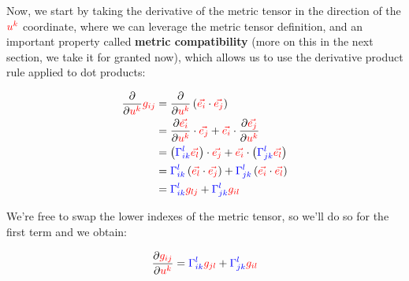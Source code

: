 Now, we start by taking the derivative of the metric tensor in the direction of the $\color{red}u^k$ coordinate, where we can leverage the metric tensor
definition, and an important property called \textbf{metric compatibility} (more on this in the next section, we take it for granted now), which allows us to use 
the derivative product rule applied to dot products:

\begin{align*}
    \frac{\partial}{\partial \begingroup\color{red}u^k\endgroup} \begingroup\color{red}g_{ij}\endgroup &= \frac{\partial}{\partial \begingroup\color{red}u^k\endgroup} \left(\begingroup\color{red}\vec{e_i}\endgroup \cdot \begingroup\color{red}\vec{e_j}\endgroup\right)\\
    &= \frac{\partial \begingroup\color{red}\vec{e_i}\endgroup}{\partial \begingroup\color{red}u^k\endgroup} \cdot \begingroup\color{red}\vec{e_j}\endgroup + \begingroup\color{red}\vec{e_i}\endgroup \cdot \frac{\partial \begingroup\color{red}\vec{e_j}\endgroup}{\partial \begingroup\color{red}u^k\endgroup}\\
    &= \left(\begingroup\color{blue}\Gamma^{l}_{ik}\endgroup \begingroup\color{red}\vec{e_l}\endgroup\right) \cdot \begingroup\color{red}\vec{e_j}\endgroup + \begingroup\color{red}\vec{e_i}\endgroup \cdot \left(\begingroup\color{blue}\Gamma^{l}_{jk}\endgroup \begingroup\color{red}\vec{e_l}\endgroup\right)\\
    &= \begingroup\color{blue}\Gamma^{l}_{ik}\endgroup \left(\begingroup\color{red}\vec{e_l}\endgroup \cdot \begingroup\color{red}\vec{e_j}\endgroup\right) + \begingroup\color{blue}\Gamma^{l}_{jk}\endgroup \left(\begingroup\color{red}\vec{e_i}\endgroup \cdot \begingroup\color{red}\vec{e_l}\endgroup\right)\\
    &= \begingroup\color{blue}\Gamma^{l}_{ik}\endgroup \begingroup\color{red}g_{lj}\endgroup + \begingroup\color{blue}\Gamma^{l}_{jk}\endgroup \begingroup\color{red}g_{il}\endgroup
\end{align*}

We're free to swap the lower indexes of the metric tensor, so we'll do so for the first term and we obtain:

\begin{equation}
    \frac{\partial \begingroup\color{red}g_{ij}\endgroup}{\partial \begingroup\color{red}u^k\endgroup}  = 
    \begingroup\color{blue}\Gamma^{l}_{ik}\endgroup \begingroup\color{red}g_{jl}\endgroup + \begingroup\color{blue}\Gamma^{l}_{jk}\endgroup \begingroup\color{red}g_{il}\endgroup
\end{equation}


